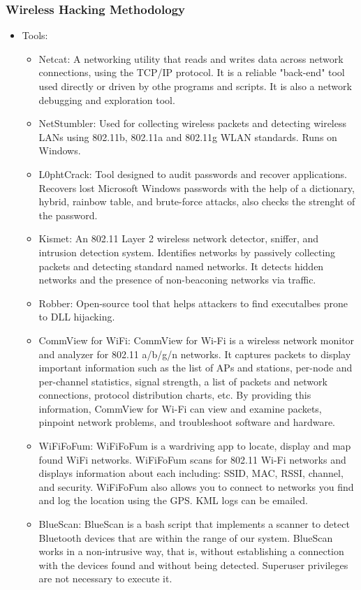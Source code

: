 \subsubsection{Wireless Hacking Methodology}
\begin{itemize}
    \item Tools:
    \begin{itemize}
        \item Netcat: A networking utility that reads and writes data across network connections, using the TCP/IP protocol. It is a reliable "back-end" tool used directly or driven by othe programs and scripts. It is also a network debugging and exploration tool.
        \item NetStumbler: Used for collecting wireless packets and detecting wireless LANs using 802.11b, 802.11a and 802.11g WLAN standards. Runs on Windows.
        \item L0phtCrack: Tool designed to audit passwords and recover applications. Recovers lost Microsoft Windows passwords with the help of a dictionary, hybrid, rainbow table, and brute-force attacks, also checks the strenght of the password.
        \item Kismet: An 802.11 Layer 2 wireless network detector, sniffer, and intrusion detection system. Identifies networks by passively collecting packets and detecting standard named networks. It detects hidden networks and the presence of non-beaconing networks via traffic.
        \item Robber: Open-source tool that helps attackers to find executalbes prone to DLL hijacking. 
        \item CommView for WiFi: CommView for Wi-Fi is a wireless network monitor and analyzer for 802.11 a/b/g/n networks. It captures packets to display important information such as the list of APs and stations, per-node and per-channel statistics, signal strength, a list of packets and network connections, protocol distribution charts, etc. By providing this information, CommView for Wi-Fi can view and examine packets, pinpoint network problems, and troubleshoot software and hardware.
        \item WiFiFoFum: WiFiFoFum is a wardriving app to locate, display and map found WiFi networks. WiFiFoFum scans for 802.11 Wi-Fi networks and displays information about each including: SSID, MAC, RSSI, channel, and security. WiFiFoFum also allows you to connect to networks you find and log the location using the GPS. KML logs can be emailed.
        \item BlueScan: BlueScan is a bash script that implements a scanner to detect Bluetooth devices that are within the range of our system. BlueScan works in a non-intrusive way, that is, without establishing a connection with the devices found and without being detected. Superuser privileges are not necessary to execute it.

\end{itemize}
\end{itemize}
